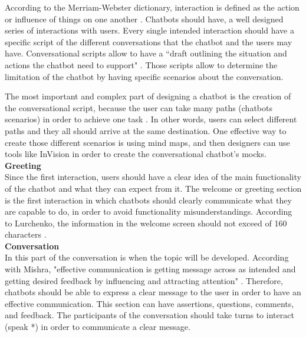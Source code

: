 \documentclass[a4paper,10pt]{article}
\begin{document}
According to the Merriam-Webster dictionary, interaction is defined as the action or influence of things on one another \cite{merriam-webster}.
Chatbots should have, a well designed series of interactions with users. Every single intended interaction should have a specific script of the different conversations that the chatbot and the users may have. Conversational scripts allow to have a ``draft outlining the situation and actions the chatbot need to support" \cite{CaseStudy}. Those scripts allow to determine the limitation of the chatbot by having specific scenarios about the conversation. 

The most important and complex part of designing a chatbot is the creation of the conversational script, because the user can take many paths (chatbots scenarios) in order to achieve one task \cite{designChatbotConversatio}. In other words, users can select different paths and they all should arrive at the same destination. One effective way to create those different scenarios is using mind maps, and then designers can use tools like InVision in order to create the conversational chatbot's mocks.    \\[0\baselineskip]

\textbf{Greeting}\\[0\baselineskip]
Since the first interaction, users should have a clear idea of the main functionality of the chatbot and what they can expect from it.
The welcome or greeting section is the first interaction in which chatbots should clearly communicate what they are capable to do, in order to avoid functionality misunderstandings. According to Lurchenko, the information in the welcome screen should not exceed of 160 characters \cite{CheatSheet}. \\[0\baselineskip]

\textbf{Conversation}\\[0\baselineskip]
In this part of the conversation is when the topic will be developed. According with Mishra, "effective communication is getting message across as intended and getting desired feedback by influencing and attracting attention" \cite{effectivCommunication}. Therefore, chatbots should be able to express a clear message to the user in order to have an effective communication. This section can have assertions, questions, comments, and feedback. The participants of the conversation should take turns to interact (speak *) in order to communicate a clear message. \\[0\baselineskip]
\end{document}
